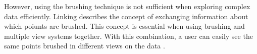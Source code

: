 However, using the brushing technique is not sufficient when exploring complex data efficiently. Linking describes the concept of exchanging information about which poiunts are brushed. This concept is essential when using brushing and multiple view systems together. With this combination, a user can easily see the same points brushed in different views on the data .

